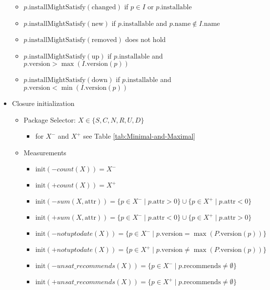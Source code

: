 \documentclass[a4paper,english]{article}
\begin{document}
\begin{itemize}
\begin{itemize}
      \item $p.\mathrm{installMightSatisfy}(\mathrm{changed})$ if $p\in I$ or $p.\mathrm{installable}$
      \item $p.\mathrm{installMightSatisfy}(\mathrm{new})$ if $p.\mathrm{installable}$ and $p.\mathrm{name}\not\in I.\mathrm{name}$
      \item $p.\mathrm{installMightSatisfy}(\mathrm{removed})$ does not hold
      \item $p.\mathrm{installMightSatisfy}(\mathrm{up})$ if $p.\mathrm{installable}$ and $p.\mathrm{version}>\max(I.\mathrm{version}(p))$
      \item $p.\mathrm{installMightSatisfy}(\mathrm{down})$ if $p.\mathrm{installable}$ and $p.\mathrm{version}<\min(I.\mathrm{version}(p))$
    \end{itemize}
  \item Closure initialization
    \begin{itemize}
      \item Package Selector: $X\in\{S,C,N,R,U,D\}$
        \begin{itemize}
          \item for $X^{-}$ and $X^{+}$ see Table \ref{tab:Minimal-and-Maximal}
        \end{itemize}
      \item Measurements
        \begin{itemize}
          \item $\mathrm{init}({-}\mathit{count}(X))=X^{-}$
          \item $\mathrm{init}({+}\mathit{count}(X))=X^{+}$
          \item $\mathrm{init}({-}\mathit{sum}(X,\mathrm{attr}))=\{p\in X^{-}\mid p.\mathrm{attr}>0\}\cup\{p\in X^{+}\mid p.\mathrm{attr}<0\}$
          \item $\mathrm{init}({+}\mathit{sum}(X,\mathrm{attr}))=\{p\in X^{-}\mid p.\mathrm{attr}<0\}\cup\{p\in X^{+}\mid p.\mathrm{attr}>0\}$
          \item $\mathrm{init}({-}\mathit{notuptodate}(X))=\{p\in X^{-}\mid p.\mathrm{version}=\max(P.\mathrm{version}(p))\}$
          \item $\mathrm{init}({+}\mathit{notuptodate}(X))=\{p\in X^{+}\mid p.\mathrm{version}\not=\max(P.\mathrm{version}(p))\}$
          \item $\mathrm{init}({-}\mathit{unsat\_recommends}(X))=\{p\in X^{-}\mid p.\mathrm{recommends}\neq\emptyset\}$
          \item $\mathrm{init}({+}\mathit{unsat\_recommends}(X))=\{p\in X^{+}\mid p.\mathrm{recommends}\neq\emptyset\}$

\end{itemize}
\end{itemize}
\end{itemize}
\end{document}
